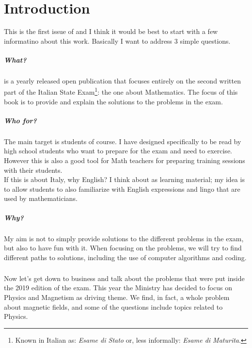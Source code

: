 
\chapter*{Introduction}

This is the first issue of \TST and I think it would be best to start with a
few informatino about this work. Basically I want to address 3 simple
questions.

\paragraph{What?} \TST is a yearly released open publication that focuses
entirely on the second written part of the Italian
State Exam\footnote{Known in Italian as:
\textit{Esame di Stato} or, less informally: \textit{Esame di Maturita}.}:
the one about Mathematics. The focus of this book is to provide and
explain the solutions to the problems in the exam.

\paragraph{Who for?} The main target is students of course. I have designed
\TST specifically to be read by high school students who want to prepare
for the exam and need to exercise. However this is also a good tool for
Math teachers for preparing training sessions with their students.\\
If this is about Italy, why English? I think about \TST as learning
material; my idea is to allow students to also familiarize with
English expressions and lingo that are used by mathematicians.

\paragraph{Why?} My aim is not to simply provide solutions to the
different problems in the exam, but also to have fun with it.
When focusing on the problems, we will try to find different paths to
solutions, including the use of computer algorithms and coding.

\paragraph{} Now let's get down to business and talk about the problems
that were put inside the 2019 edition of the exam. This year the Ministry
has decided to focus on Physics and Magnetism as driving theme. We find,
in fact, a whole problem about magnetic fields, and some of the questions
include topics related to Physics.
